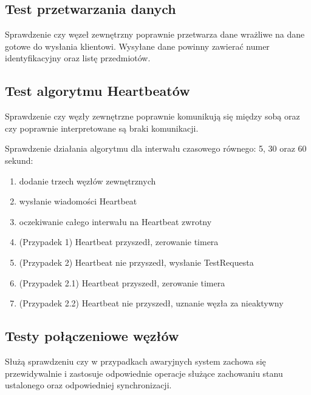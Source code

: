 \subsection[Test przetwarzania danych]{Test przetwarzania danych}
Sprawdzenie czy węzeł zewnętrzny poprawnie przetwarza dane wrażliwe na dane gotowe do wysłania klientowi. Wysyłane dane powinny zawierać numer identyfikacyjny oraz listę przedmiotów.

\subsection[Test algorytmu Heartbeatów]{Test algorytmu Heartbeatów}
Sprawdzenie czy węzły zewnętrzne poprawnie komunikują się między sobą oraz czy poprawnie interpretowane są braki komunikacji.

Sprawdzenie działania algorytmu dla interwału czasowego równego: 5, 30 oraz 60 sekund:
\begin{enumerate}
\item dodanie trzech węzłów zewnętrznych
\item wysłanie wiadomości Heartbeat
\item oczekiwanie całego interwału na Heartbeat zwrotny
\item (Przypadek 1) Heartbeat przyszedł, zerowanie timera
\item (Przypadek 2) Heartbeat nie przyszedł, wysłanie TestRequesta
\item (Przypadek 2.1) Heartbeat przyszedł, zerowanie timera
\item (Przypadek 2.2) Heartbeat nie przyszedł, uznanie węzła za nieaktywny
\end{enumerate}

\subsection[Testy połączeniowe węzłów]{Testy połączeniowe węzłów}
Służą sprawdzeniu czy w przypadkach awaryjnych system zachowa się przewidywalnie i zastosuje odpowiednie operacje służące zachowaniu stanu ustalonego oraz odpowiedniej synchronizacji.

